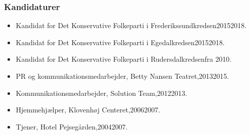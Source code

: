 \documentclass[11pt, a4paper]{awesome-cv}
\begin{document}
\begin{cvletter}
\subsubsection*{Kandidaturer}
\begin{itemize}
\item Kandidat for Det Konservative Folkeparti i Frederikssundkredsen20152018.
\item Kandidat for Det Konservative Folkeparti i Egedalkredsen20152018.
\item Kandidat for Det Konservative Folkeparti i Rudersdalkredsenfra 2010.
\end{itemize}
\begin{itemize}
\item PR og kommunikationsmedarbejder, Betty Nansen Teatret,20132015.
\item Kommunikationsmedarbejder, Solution Team,20122013.
\item Hjemmehjælper, Klovenhøj Centeret,20062007.
\item Tjener, Hotel Pejsegården,20042007.
\end{itemize}
\end{cvletter}
\end{document}
